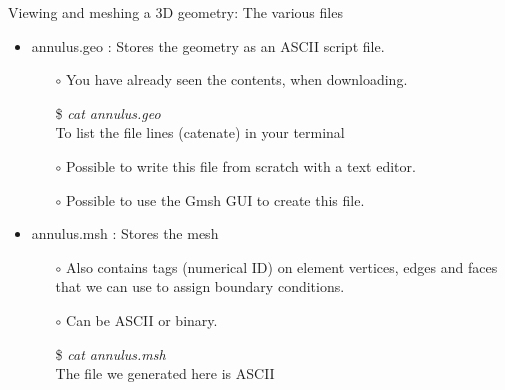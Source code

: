 \documentclass[t]{beamer}
\begin{document}
\begin{frame}{Viewing and meshing a 3D geometry: The various files}
   \begin{itemize}
      \item annulus.geo : Stores the geometry as an ASCII script file.
      \begin{itemize}
         \item[$\circ$] You have already seen the contents, when downloading.
         \item[\$] \emph{cat annulus.geo} \\ \hspace{10pt} To list the file lines (catenate) in your terminal
         \item[$\circ$] Possible to write this file from scratch with a text editor.
         \item[$\circ$] Possible to use the Gmsh GUI to create this file.
      \end{itemize}\vspace{10pt}
      \item annulus.msh : Stores the mesh
      \begin{itemize}
         \item[$\circ$] Also contains tags (numerical ID) on element vertices, edges and faces that we can use to assign boundary conditions.
         \item[$\circ$] Can be ASCII or binary.
         \item[\$] \emph{cat annulus.msh} \\ \hspace{10pt} The file we generated here is ASCII
      \end{itemize}
   \end{itemize}
\end{frame}
\end{document}
